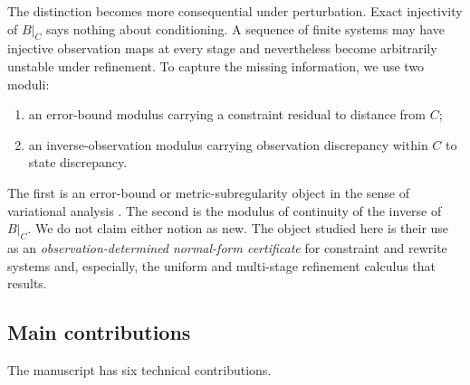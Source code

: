 \documentclass[11pt]{article}
\theoremstyle{definition}
\theoremstyle{remark}
\numberwithin{equation}{section}
\begin{document}
The distinction becomes more consequential under perturbation.  Exact injectivity of $B|_C$ says nothing about conditioning.  A sequence of finite systems may have injective observation maps at every stage and nevertheless become arbitrarily unstable under refinement.  To capture the missing information, we use two moduli:
\begin{enumerate}[label=(\roman*)]
\item an error-bound modulus carrying a constraint residual to distance from $C$;
\item an inverse-observation modulus carrying observation discrepancy within $C$ to state discrepancy.
\end{enumerate}
The first is an error-bound or metric-subregularity object in the sense of variational analysis \citep{Hoffman1952,Kruger2015,CibulkaDontchevKruger2018,DontchevRockafellar2014}.  The second is the modulus of continuity of the inverse of $B|_C$.  We do not claim either notion as new.  The object studied here is their use as an \emph{observation-determined normal-form certificate} for constraint and rewrite systems and, especially, the uniform and multi-stage refinement calculus that results.

\subsection{Main contributions}

The manuscript has six technical contributions.
\end{document}
